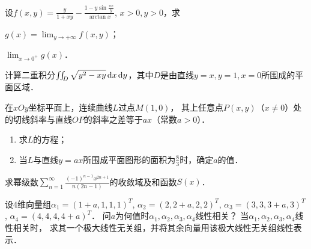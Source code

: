 \documentclass[plain,noanswer,medmath]{../../template/jnuexam}
\begin{document}










\begin{problem}[points=7]
设$f(x,y) = \frac{y}{1 + xy} - \frac{1 - y\sin \frac{\pi x}{y}}{\arctan x}$, $x > 0,y > 0$，求\par
\begin{enumerate*}
\item $g(x) = \lim_{y \to +\infty} f\left(x,y \right)$；
\item $\lim_{x \to 0^+} g(x)$．
\end{enumerate*}
\end{problem}


\begin{problem}[points=7]
计算二重积分$\iint_D \sqrt{y^2 - xy} \mathop{}\!\mathrm{d} x\mathop{}\!\mathrm{d} y$，其中$D$是由直线$y = x,y = 1,x = 0$所围成的平面区域．
\end{problem}




\begin{problem}[points=8]
在$xOy$坐标平面上，连续曲线$L$过点$M\left(1,0 \right)$，
其上任意点$P\left(x,y \right)$（$x \ne 0$）处的切线斜率与直线$OP$的斜率之差等于$ax$（常数$a > 0$）．
\begin{enumerate}
\item 求$L$的方程；
\item 当$L$与直线$y = ax$所围成平面图形的面积为$\frac{8}{3}$时，确定$a$的值．
\end{enumerate}
\end{problem}


\begin{problem}[points=10]
求幂级数$\sum_{n = 1}^{\infty}\frac{(- 1)^{n - 1}x^{2n + 1}}{n(2n - 1)}$的收敛域及和函数$S(x)$．
\end{problem}


\begin{problem}[points=13]
设$4$维向量组$\alpha_1 = (1 + a,1,1,1)^T$, $\alpha_2 = (2,2 + a,2,2)^T$, 
$\alpha_3 = (3,3,3 + a,3)^T$, $\alpha_4 = (4,4,4,4 + a)^T$．
问$a$为何值时$\alpha_1,\alpha_2,\alpha_3,\alpha_4$线性相关？
当$\alpha_1,\alpha_2,\alpha_3,\alpha_4$线性相关时，
求其一个极大线性无关组，并将其余向量用该极大线性无关组线性表示．
\end{problem}
\end{document}

